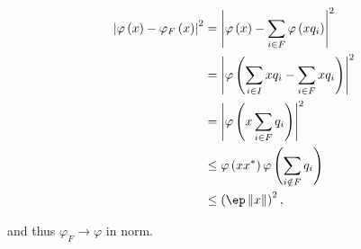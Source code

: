 \documentclass[a4paper,10pt]{report}
\begin{document}
\begin{enumerate}
\begin{align*}
  \left| \varphi \left( x \right) - \varphi_F \left( x \right) \right|^2%
  &= \left| \varphi \left( x \right) - \sum_{i \in F} \varphi \left( x q_i \right) \right|^2\\
  &= \left| \varphi \left( \sum_{i \in I} x q_i - \sum_{i \in F} x q_i \right) \right|^2\\
  &= \left| \varphi \left( x \sum_{i \in F} q_i \right) \right|^2\\
  &\leq \varphi \left( x x^* \right) \varphi \left( \sum_{i \notin F} q_i \right)\\
  &\leq \left( \ep \left\| x \right\| \right)^2,
\end{align*}

and thus $\varphi_F \to \varphi$ in norm.\\
\end{enumerate}
\end{document}
